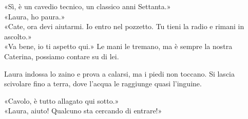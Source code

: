 \par\medskip
«Sì, \`e un cavedio tecnico, un classico anni Settanta.»\\
«Laura, ho paura.»\\
«Cate, ora devi aiutarmi. Io entro nel pozzetto. Tu tieni la radio e rimani in ascolto.»\\
«Va bene, io ti aspetto qui.» Le mani le tremano, ma \`e sempre la nostra Caterina, possiamo contare su di lei.

\par\medskip
Laura indossa lo zaino e prova a calarsi, ma i piedi non toccano.  
Si lascia scivolare fino a terra, dove l’acqua le raggiunge quasi l’inguine.

\par\medskip
«Cavolo, \`e tutto allagato qui sotto.»\\
«Laura, aiuto! Qualcuno sta cercando di entrare!»
